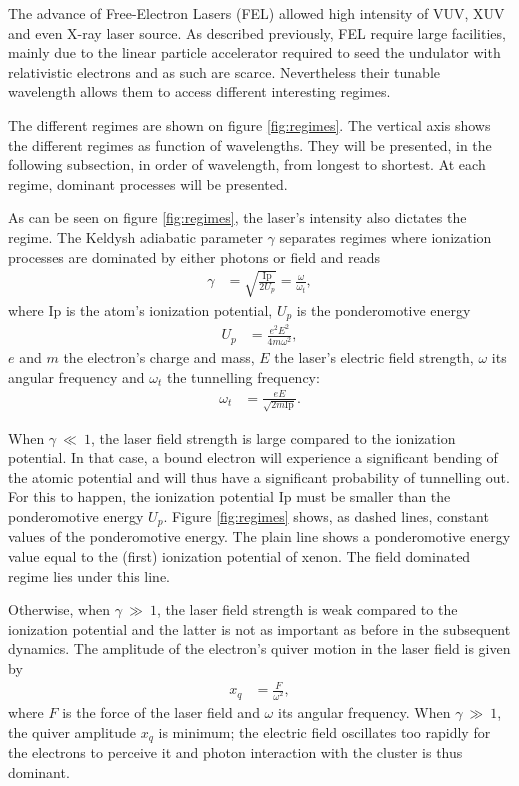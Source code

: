 The advance of Free-Electron Lasers (FEL) allowed high intensity of VUV, XUV and
even X-ray laser source. As described previously, FEL require large facilities,
mainly due to the linear particle accelerator required to seed the undulator
with relativistic electrons and as such are scarce. Nevertheless their
tunable wavelength allows them to access different interesting regimes.

The different regimes are shown on figure \ref{fig:regimes}.
The vertical axis shows the different regimes as
function of wavelengths. They will be presented, in the following subsection,
in order of wavelength, from longest to shortest. At each regime, dominant
processes will be presented.

As can be seen on figure \ref{fig:regimes}, the laser's intensity also dictates
the regime.
The Keldysh adiabatic parameter $\gamma$ separates regimes where ionization
processes are dominated by either photons or field\cite{Long2010} and reads
\begin{align}
\gamma & = \sqrt{ \frac{\textrm{Ip}}{2 U_p} } = \frac{\omega}{\omega_t},
\end{align}
where Ip is the atom's ionization potential, $U_p$ is the ponderomotive energy
\begin{align}
U_p & = \frac{e^2 E^2}{4 m \omega^2},
\end{align}
$e$ and $m$ the electron's charge and mass, $E$ the laser's electric field
strength, $\omega$ its angular frequency and $\omega_t$ the tunnelling
frequency:
\begin{align}
\omega_t & = \frac{e E}{\sqrt{2 m \textrm{Ip}}}.
\end{align}

When $\gamma~\ll~1$, the laser field strength is large compared to the ionization
potential. In that case, a bound electron will experience a significant bending of the
atomic potential and will thus have a significant probability of tunnelling out.
For this to happen, the ionization potential Ip must be
smaller than the ponderomotive energy $U_p$. Figure \ref{fig:regimes} shows,
as dashed lines, constant values of the ponderomotive energy. The plain line shows
a ponderomotive energy value equal to the (first) ionization potential of xenon.
The field dominated regime lies under this line.

Otherwise, when $\gamma~\gg~1$, the laser field strength is weak compared to
the ionization potential and the latter is not as important as before in the
subsequent dynamics. The amplitude of the electron's quiver motion in the laser
field is given by
\begin{align}
x_q & = \frac{F}{\omega^2},
\label{eqn:quiver}
\end{align}
where $F$ is the force of the laser field and $\omega$ its angular frequency.
When $\gamma~\gg~1$, the quiver amplitude $x_q$ is minimum; the electric field
oscillates too rapidly for the electrons to perceive it and photon interaction with
the cluster is thus dominant.

